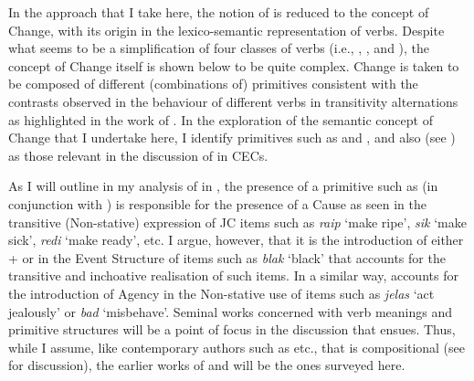 In the approach that I take here, the notion of  is
reduced to the concept of Change, with its origin in the
lexico-semantic representation of verbs.  Despite what seems to be a
simplification of  four classes of verbs (i.e.,
, ,  and ), the concept of
Change itself is shown below to be quite complex.  Change is taken to
be composed of different (combinations of) primitives consistent with
the contrasts observed in the behaviour of different verbs in
transitivity alternations as highlighted in the work of
\citet{Levin1993}.  In the exploration of the semantic concept of
Change that I undertake here, I identify primitives such as \CAUSE and
\DO, and also \BECOME (see \citealt{McCawley1968,Carter1976, Dowty1979,})
as those relevant in the discussion of  in CECs.

As I will outline in my analysis of  in , 
the presence of a primitive such as \CAUSE (in conjunction with
\BECOME) is responsible for the presence of a Cause as seen in the
transitive (Non-stative) expression of JC items such as \textit{raip}
`make ripe',  \textit{sik} `make sick', \textit{redi} `make ready', etc.
I argue, however, that it is the introduction of either \CAUSE + \BECOME
or \BECOME in the Event Structure of items such as \textit{blak}
`black' that accounts for the transitive and inchoative realisation of
such items.  In a similar way, \DO accounts for the introduction of
Agency in the Non-stative use of items such as \textit{jelas} `act
jealously' or \textit{bad} `misbehave'.  Seminal works concerned with
verb meanings and primitive structures will be a point of focus in the
discussion that ensues.  Thus, while I assume, like contemporary
authors such as \citet{Verkuyl1999,Tenny1994,TennyPustejovsky2000,Rothstein2004,MacDonald2008,} 
etc., that  is compositional (see  for discussion),
the earlier works of \citet{McCawley1968,Carter1976,Dowty1979,Pustejovsky1988,Pustejovsky1991} 
and \citet{Grimshaw1990} will be the ones surveyed here.

